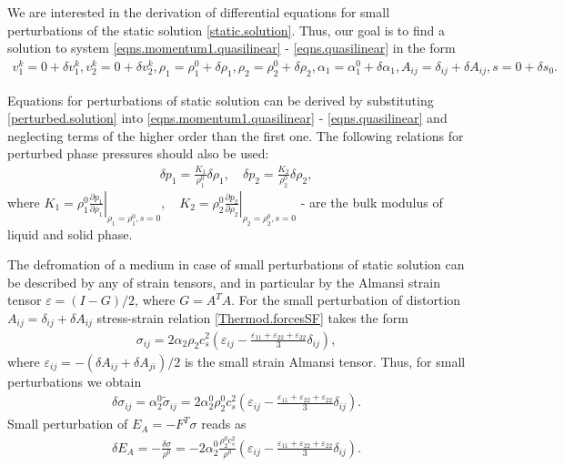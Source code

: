 \documentclass[3p,times]{elsarticle}
\begin{document}
We are interested in the derivation of differential equations for small perturbations of the static solution \eqref{static.solution}. Thus, our goal is to find a solution  to system \eqref{eqns.momentum1.quasilinear} - \eqref{eqns.quasilinear} in the form
\begin{align} \label{perturbed.solution} 
v_1^k=0 +\delta v_1^k, v_2^k=0 +\delta v_2^k, 
\rho_1=\rho_1^0 +\delta \rho_1, \rho_2=\rho_2^0+\delta \rho_2, 
\alpha_1=\alpha_1^0+\delta \alpha_1, A_{ij}=\delta_{ij}+\delta A_{ij}, s=0+\delta s_0.
\end{align} 

Equations for perturbations of static solution can be derived by substituting \eqref{perturbed.solution} into \eqref{eqns.momentum1.quasilinear} - \eqref{eqns.quasilinear} and neglecting terms of the higher order than the first one. 
The following relations for perturbed phase pressures should also be used:
\begin{align}\label{pressure.linear}
\delta p_1 =\frac{K_1}{\rho_1^0} \delta \rho_1, \quad \delta p_2 = \frac{K_2}{\rho_2^0} \delta \rho_2,
\end{align}
where $
K_1=\left. \rho_1^0\frac{\partial p_1}{\partial \rho_1}\right|_{\rho_1=\rho_1^0, s=0},
\quad
K_2=\left. \rho_2^0\frac{\partial p_2}{\partial \rho_2}\right|_{\rho_2=\rho_2^0, s=0} 
$ 
- are the bulk modulus of liquid and solid phase.

The defromation of a medium in case of small perturbations of static solution can be described by any of  strain tensors, and in particular by the Almansi strain tensor $\varepsilon = (I - G)/2$, where $G=A^TA$. 
For the small perturbation of distortion $A_{ij}=\delta_{ij}+\delta A_{ij}$ stress-strain relation \eqref{Thermod.forcesSF} takes the form 
\begin{align} \label{stress}
\sigma_{ij}=2\alpha_2 \rho_2 c^2_s \left(\varepsilon_{ij}-\frac{\varepsilon_{11}+\varepsilon_{22}+\varepsilon_{22}}{3}\delta_{ij}\right),
\end{align}  
where $\varepsilon_{ij}=-(\delta A_{ij}+\delta A_{ji})/2$ is the small strain Almansi tensor. Thus, for small perturbations we obtain
\begin{align} \label{stress}
\delta \sigma_{ij}= \alpha_2^0 \tilde \sigma_{ij} =
2\alpha_2^0 \rho_2^0 c^2_s \left(\varepsilon_{ij}-\frac{\varepsilon_{11}+\varepsilon_{22}+\varepsilon_{22}}{3}\delta_{ij}\right).
\end{align}  
Small perturbation of $E_{A}=-F^T \sigma$ reads as
\begin{align}
\delta E_A=- \frac{\delta \sigma}{\rho^0}=-
2\alpha_2^0 \frac{\rho_2^0 c^2_s}{\rho^0} \left(\varepsilon_{ij}-\frac{\varepsilon_{11}+\varepsilon_{22}+\varepsilon_{22}}{3}\delta_{ij}\right).
\end{align} 
\end{document}
